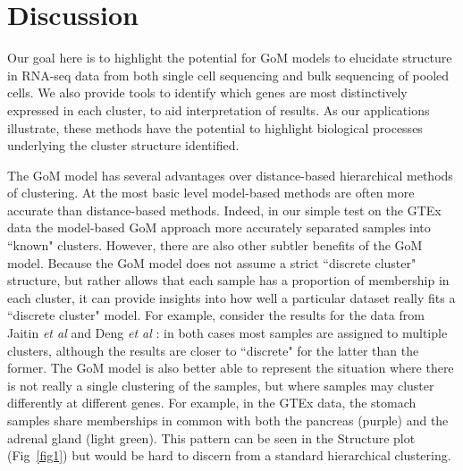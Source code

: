 \documentclass[10pt,letterpaper]{article}
\begin{document}




\section*{Discussion}

Our goal here is to highlight the potential for GoM models to elucidate
structure in RNA-seq data from both single cell sequencing and bulk sequencing of pooled cells.
We also provide tools to identify which genes
are most distinctively expressed in each cluster, to aid interpretation of results.
As our applications illustrate, these methods have the potential to highlight biological processes
underlying the cluster structure identified.

The GoM model has several advantages over distance-based hierarchical methods of clustering. At the most basic level model-based methods are often
more accurate than distance-based methods. Indeed, in our simple test on the GTEx data the model-based GoM approach
more accurately separated samples into ``known" clusters. However, there are also other subtler benefits of the GoM model. Because the GoM
model does not assume a strict ``discrete cluster" structure, but
rather allows that each sample has a proportion of membership in each cluster, it can provide insights into how well a
particular dataset really fits a ``discrete cluster" model. For example, consider the results for the data from Jaitin \textit{et al} \cite{Jaitin2014} and Deng \textit{et al} \cite{Deng2014}:
in both cases most samples are assigned to multiple clusters, although the results are closer to ``discrete" for the latter than the former.
The GoM model is also better able to represent the situation where there is not really a single clustering of the samples,
but where samples may cluster differently at different genes. For example, in the GTEx data, the stomach samples share memberships in common with
both the pancreas (purple) and the adrenal gland (light green). This pattern can be seen in the Structure plot (Fig~\ref{fig1}) but would be hard to
discern from a standard hierarchical clustering.
\end{document}
